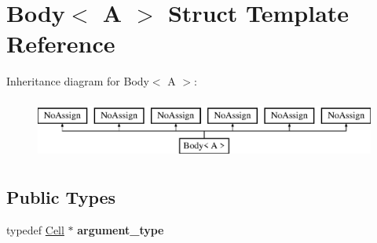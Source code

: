 \hypertarget{classBody}{}\section{Body$<$ A $>$ Struct Template Reference}
\label{classBody}
Inheritance diagram for Body$<$ A $>$\+:\begin{figure}[H]
\begin{center}
\leavevmode
\includegraphics[height=2.000000cm]{classBody}
\end{center}
\end{figure}
\subsection*{Public Types}
\begin{DoxyCompactItemize}
\item 
\hypertarget{classBody_ab76357f9af9c04d0a59a48e266429408}{}typedef \hyperlink{classCell}{Cell} $\ast$ {\bfseries argument\+\_\+type}\label{classBody_ab76357f9af9c04d0a59a48e266429408}

\end{DoxyCompactItemize}
